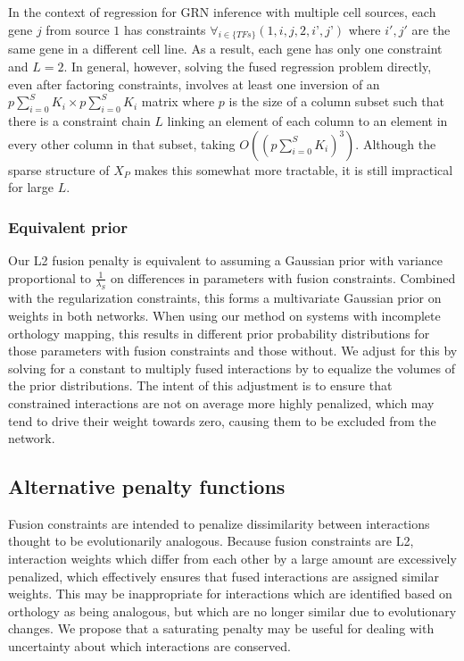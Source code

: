 \documentclass[11pt]{article}
\begin{document}
In the context of regression for GRN inference with multiple cell sources, each gene $j$ from source $1$ has constraints $\forall_{i \in \{TFs\}} (1, i, j, 2, i’, j’)$ where $i',j'$ are the same gene in a different cell line.
As a result, each gene has only one constraint and $L=2$.
In general, however, solving the fused regression problem directly, even after factoring constraints, involves at least one inversion of an $p\sum_{i=0}^S K_i \times p \sum_{i=0}^S K_i$ matrix where $p$ is the size of a column subset such that there is a constraint chain $L$ linking an element of each column to an element in every other column in that subset, taking $O((p\sum_{i=0}^S K_i)^3)$.
Although the sparse structure of $X_P$ makes this somewhat more tractable, it is still impractical for large $L$.


\subsubsection{Equivalent prior}
Our L2 fusion penalty is equivalent to assuming a Gaussian prior with variance proportional to $\frac{1}{\lambda_S}$ on differences in parameters with fusion constraints. Combined with the regularization constraints, this forms a multivariate Gaussian prior on weights in both networks. When using our method on systems with incomplete orthology mapping, this results in different prior probability distributions for those parameters with fusion constraints and those without. We adjust for this by solving for a constant to multiply fused interactions by to equalize the volumes of the prior distributions. The intent of this adjustment is to ensure that constrained interactions are not on average more highly penalized, which may tend to drive their weight towards zero, causing them to be excluded from the network. 

\subsection{Alternative penalty functions}
Fusion constraints are intended to penalize dissimilarity between interactions thought to be evolutionarily analogous. Because fusion constraints are L2, interaction weights which differ from each other by a large amount are excessively penalized, which effectively ensures that fused interactions are assigned similar weights. This may be inappropriate for interactions which are identified based on orthology as being analogous, but which are no longer similar due to evolutionary changes. We propose that a saturating penalty may be useful for dealing with uncertainty about which interactions are conserved. 
\end{document}
